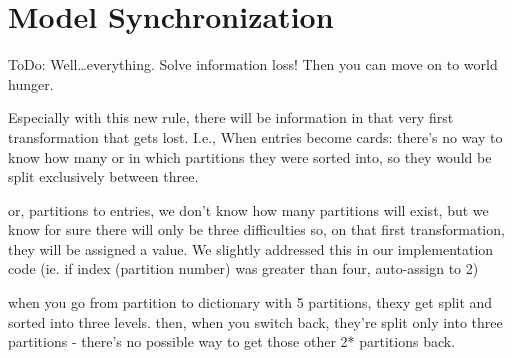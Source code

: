 \newpage
\section{Model Synchronization}
\genHeader

ToDo: Well\ldots everything. Solve information loss! Then you can move on to world hunger.

Especially with this new rule, there will be information in that very first transformation that gets lost. I.e., When entries become cards: there's no way to
know how many or in which partitions they were sorted into, so they would be split exclusively between three.

or, partitions to entries, we don't know how many partitions will exist, but we know for sure there will only be three difficulties so, on that first
transformation, they will be assigned a value. We slightly addressed this in our implementation code (ie. if index (partition number) was greater than four,
auto-assign to 2) 

when you go from partition to dictionary with 5 partitions, thexy get split and sorted into three levels. then, when you switch back, they're split only into
three partitions - there's no possible way to get those other 2* partitions back.
